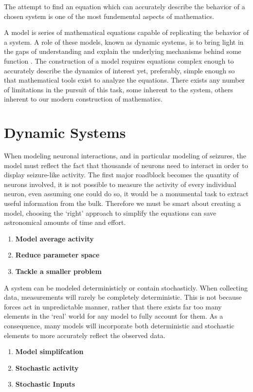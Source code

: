 \documentclass[../../Orator.tex]{subfiles}
\begin{document}
The attempt to find an equation which can accurately describe the behavior of a chosen system is one of the most fundemental aspects of mathematics. 

A model is series of mathematical equations capable of replicating the behavior of a system. A role of these models, known as dynamic systems, is to bring light in the gaps of understanding and explain the underlying mechanisms behind some function \citelater. 
The construction of a model requires equations complex enough to accurately describe the dynamics of interest yet, preferably, simple enough so that mathematical tools exist to analyze the equations\footnotemark. 
There exists any number of limitations in the pursuit of this task, some inherent to the system, others inherent to our modern construction of mathematics.

\section{Dynamic Systems}


When modeling neuronal interactions, and in particular modeling of seizures, the model must reflect the fact that thousands of neurons need to interact in order to display seizure-like activity. 
The first major roadblock becomes the quantity of neurons involved, it is not possible to measure the activity of every individual neuron, even assuming one could do so, it would be a monumental task to extract useful information from the bulk. 
Therefore we must be smart about creating a model, choosing the `right' approach to simplify the equations can save astronomical amounts of time and effort.
\begin{enumerate}
    \item \textbf{Model average activity}
    \item \textbf{Reduce parameter space}
    \item \textbf{Tackle a smaller problem}
\end{enumerate}


A system can be modeled deterministicly or contain stochasticly. When collecting data, measurements will rarely be completely deterministic. This is not because forces act in unpredictable manner, rather that there exists far too many elements in the `real' world for any model to fully account for them. 
As a consequence, many models will incorporate both deterministic and stochastic elements to more accurately reflect the observed data.
\begin{enumerate}
    \item \textbf{Model simplifcation}
    \item \textbf{Stochastic activity}
    \item \textbf{Stochastic Inputs}
\end{enumerate}
\end{document}
